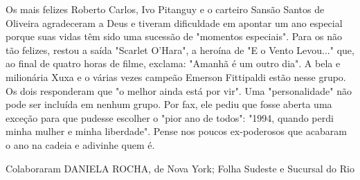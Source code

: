 Os mais felizes Roberto Carlos, Ivo Pitanguy e o carteiro Sansão Santos de Oliveira agradeceram a Deus e tiveram dificuldade em apontar um ano especial porque suas vidas têm sido uma sucessão de "momentos especiais".
Para os não tão felizes, restou a saída "Scarlet O'Hara", a heroína de "E o Vento Levou..." que, ao final de quatro horas de filme, exclama: "Amanhã é um outro dia". A bela e milionária Xuxa e o várias vezes campeão Emerson Fittipaldi estão nesse grupo. Os dois responderam que "o melhor ainda está por vir".
Uma "personalidade" não pode ser incluída em nenhum grupo. Por fax, ele pediu que fosse aberta uma exceção para que pudesse escolher o "pior ano de todos": "1994, quando perdi minha mulher e minha liberdade". Pense nos poucos ex-poderosos que acabaram o ano na cadeia e adivinhe quem é.

Colaboraram DANIELA ROCHA, de Nova York; Folha Sudeste e Sucursal do Rio

